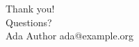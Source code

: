 \documentclass[aspectratio=169]{beamer}  %
\begin{document}
\begin{frame}[plain]
  \begin{center}
    {\Huge Thank you!}\\[1em]
    {\large Questions?}\\[2em]
    \small Ada Author \quad\textbar\quad ada@example.org
  \end{center}
\end{frame}
\end{document}
